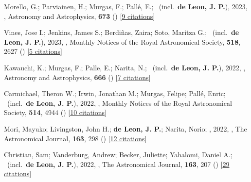 \item[{\color{numcolor}\scriptsize50}] Morello, G.; Parviainen, H.; Murgas, F.; Pall{\'e}, E.; \etal\ (incl.\ \textbf{de Leon, J. P.}), 2023, , Astronomy and Astrophysics, \textbf{673} () [\href{https://ui.adsabs.harvard.edu/abs/2023A&A...673A..32M}{9 citations}]

\item[{\color{numcolor}\scriptsize49}] Vines, Jose I.; Jenkins, James S.; Berdi{\~n}as, Zaira; Soto, Maritza G.; \etal\ (incl.\ \textbf{de Leon, J. P.}), 2023, , Monthly Notices of the Royal Astronomical Society, \textbf{518}, 2627 () [\href{https://ui.adsabs.harvard.edu/abs/2023MNRAS.518.2627V}{5 citations}]

\item[{\color{numcolor}\scriptsize48}] Kawauchi, K.; Murgas, F.; Palle, E.; Narita, N.; \etal\ (incl.\ \textbf{de Leon, J. P.}), 2022, , Astronomy and Astrophysics, \textbf{666} () [\href{https://ui.adsabs.harvard.edu/abs/2022A&A...666A...4K}{7 citations}]

\item[{\color{numcolor}\scriptsize47}] Carmichael, Theron W.; Irwin, Jonathan M.; Murgas, Felipe; Pall{\'e}, Enric; \etal\ (incl.\ \textbf{de Leon, J. P.}), 2022, , Monthly Notices of the Royal Astronomical Society, \textbf{514}, 4944 () [\href{https://ui.adsabs.harvard.edu/abs/2022MNRAS.514.4944C}{10 citations}]

\item[{\color{numcolor}\scriptsize46}] Mori, Mayuko; Livingston, John H.; \textbf{de Leon, J. P.}; Narita, Norio; \etal, 2022, , The Astronomical Journal, \textbf{163}, 298 () [\href{https://ui.adsabs.harvard.edu/abs/2022AJ....163..298M}{12 citations}]

\item[{\color{numcolor}\scriptsize45}] Christian, Sam; Vanderburg, Andrew; Becker, Juliette; Yahalomi, Daniel A.; \etal\ (incl.\ \textbf{de Leon, J. P.}), 2022, , The Astronomical Journal, \textbf{163}, 207 () [\href{https://ui.adsabs.harvard.edu/abs/2022AJ....163..207C}{29 citations}]

